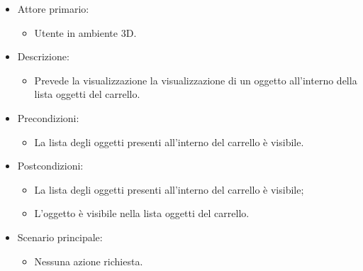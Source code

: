 \begin{itemize}
	
	\item Attore primario: 
	\begin{itemize}
		\item Utente in ambiente 3D.
	\end{itemize}
	\item Descrizione:
	\begin{itemize}
		\item Prevede la visualizzazione la visualizzazione di un oggetto all'interno della lista oggetti del carrello.
	\end{itemize}
	
	\item Precondizioni:
	\begin{itemize}
		\item La lista degli oggetti presenti all'interno del carrello è visibile.
	\end{itemize}
	
	\item Postcondizioni:
	\begin{itemize}
		\item La lista degli oggetti presenti all'interno del carrello è visibile;
		\item L'oggetto è visibile nella lista oggetti del carrello.
	\end{itemize}
	
	\item Scenario principale:
	\begin{itemize}
		\item Nessuna azione richiesta.
	\end{itemize}
	
\end{itemize}

